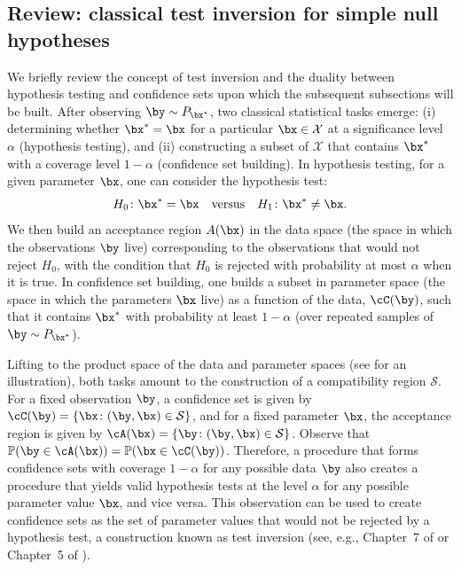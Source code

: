 \documentclass[11pt]{article}
\numberwithin{equation}{section}
\numberwithin{figure}{section}
\begin{document}
\subsection{Review: classical test inversion for simple null hypotheses} \label{subsec:test_inversion}

We briefly review the concept of test inversion and the duality between hypothesis testing and confidence sets upon which the subsequent subsections will be built.
After observing $\by \sim P_{\bx^*}$, two classical statistical tasks emerge: (i) determining whether $\bx^* = \bx$ for a particular $\bx \in \mathcal X$ at a significance level $\alpha$ (hypothesis testing), and (ii) constructing a subset of $\mathcal X$ that contains $\bx^*$ with a coverage level $1 -\alpha$ (confidence set building). 
In hypothesis testing, for a given parameter $\bx$, one can consider the hypothesis test:
\begin{equation} \label{eq:h_test_classic}
    H_0 \colon \bx^* = \bx \quad \text{versus} \quad H_1 \colon \bx^* \neq \bx.
\end{equation}
We then build an acceptance region $A(\bx)$ in the data space (the space in which the observations $\by$ live) corresponding to the observations that would not reject $H_0$, with the condition that $H_0$ is rejected with probability at most $\alpha$ when it is true. 
In confidence set building, one builds a subset in parameter space (the space in which the parameters $\bx$ live) as a function of the data, $\cC(\by)$, such that it contains $\bx^*$ with probability at least $1-\alpha$ (over repeated samples of $\by \sim P_{\bx^*}$). 

Lifting to the product space of the data and parameter spaces (see  for an illustration), both tasks amount to the construction of a compatibility region $\mathcal S$. 
For a fixed observation $\by$, a confidence set is given by $\cC(\by) = \{ \bx \colon (\by, \bx) \in \mathcal S\}$, and for a fixed parameter $\bx$, the acceptance region is given by $\cA(\bx) = \{ \by \colon (\by, \bx) \in \mathcal S\}$. 
Observe that $\mathbb{P}(\by \in \cA(\bx)) = \mathbb{P}(\bx \in \cC(\by))$. 
Therefore, a procedure that forms confidence sets with coverage $1-\alpha$ for any possible data $\by$ also creates a procedure that yields valid hypothesis tests at the level $\alpha$ for any possible parameter value $\bx$, and vice versa. 
This observation can be used to create confidence sets as the set of parameter values that would not be rejected by a hypothesis test, a construction known as test inversion (see, e.g., Chapter~7 of \cite{casella_berger} or Chapter~5 of \cite{Panaretos2016}).
\end{document}
